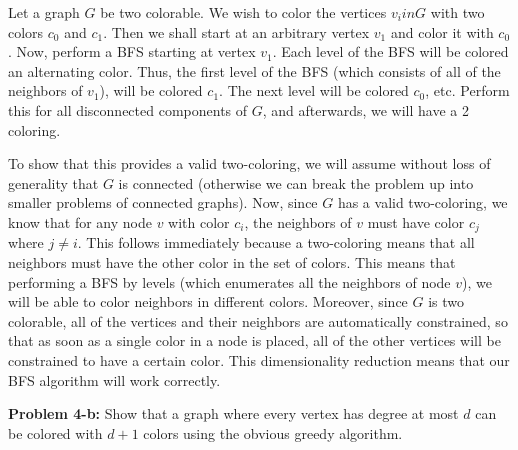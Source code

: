 \documentclass[psamsfonts]{amsart}
\newenvironment{sol}{\vspace{0.25cm}{\large \bfseries Solution:}}{\qedsymbol}
\newenvironment{prob}[1]{\begin{framed}{\large \bfseries Problem #1:}}{\end{framed}}
\begin{document}
\begin{sol}
Let a graph $G$ be two colorable. We wish to color the vertices $v_i in G$ with two colors $c_0$ and $c_1$. Then we shall start at an arbitrary vertex $v_1$ and color it with $c_0$. Now, perform a BFS starting at vertex $v_1$. Each level of the BFS will be colored an alternating color. Thus, the first level of the BFS (which consists of all of the neighbors of $v_1$), will be colored $c_1$. The next level will be colored $c_0$, etc. Perform this for all disconnected components of $G$, and afterwards, we will have a 2 coloring.

To show that this provides a valid two-coloring, we will assume without loss of generality that $G$ is connected (otherwise we can break the problem up into smaller problems of connected graphs). Now, since $G$ has a valid two-coloring, we know that for any node $v$ with color $c_i$, the neighbors of $v$ must have color $c_j$ where $j \neq i$. This follows immediately because a two-coloring means that all neighbors must have the other color in the set of colors. This means that performing a BFS by levels (which enumerates all the neighbors of node $v$), we will be able to color neighbors in different colors. Moreover, since $G$ is two colorable, all of the vertices and their neighbors are automatically constrained, so that as soon as a single color in a node is placed, all of the other vertices will be constrained to have a certain color. This dimensionality reduction means that our BFS algorithm will work correctly.
\end{sol}

\begin{prob}{4-b}
Show that a graph where every vertex has degree at most $d$ can be colored with $d+1$ colors using the obvious greedy algorithm.
\end{prob}
\end{document}
